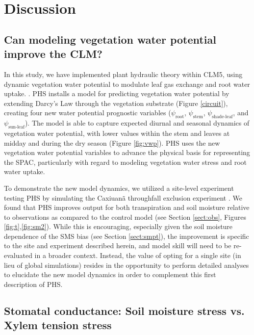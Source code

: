 \documentclass[draft,linenumbers]{agujournal}
\begin{document}
\section{Discussion}
\subsection{Can modeling vegetation water potential improve the CLM?}

    In this study, we have implemented plant hydraulic theory within CLM5, 
    using dynamic vegetation water potential to modulate leaf gas exchange and root water uptake.
     \citep{sperry1998}.
    PHS installs a model for predicting vegetation water potential by extending Darcy's Law through the vegetation substrate (Figure \ref{circuit}), 
    creating four new water potential prognostic variables ($\psi_{\text{root}}$, $\psi_{\text{stem}}$, $\psi_{\text{shade-leaf}}$, and $\psi_{\text{sun-leaf}}$).  
    The model is able to capture expected diurnal and seasonal dynamics of vegetation water potential, 
    with lower values within the stem and leaves at midday and during the dry season (Figure \ref{fig:vwp}).
    PHS uses the new vegetation water potential variables to advance the physical basis for representing the SPAC, particularly with regard to modeling vegetation water stress and root water uptake.
    
    To demonstrate the new model dynamics, we utilized a site-level experiment testing PHS by simulating the Caxiuan\~a throughfall exclusion experiment \citep{fisher2007}.
    We found that PHS improves output for both transpiration and soil moisture relative to observations as compared to the control model (see Section \ref{sect:obs}, Figures \ref{fig:t},\ref{fig:sm2}).
    While this is encouraging, especially given the soil moisture dependence of the SMS bias (see Section \ref{sect:smpt}), the improvement is specific to the site and experiment described herein, and model skill will need to be re-evaluated in a broader context.
    Instead, the value of opting for a single site (in lieu of global simulations) resides in the opportunity to perform detailed analyses to elucidate the new model dynamics in order to complement this first description of PHS.
    

\subsection{Stomatal conductance: Soil moisture stress vs. Xylem tension stress}
    \label{sect:stress}
    
\end{document}
